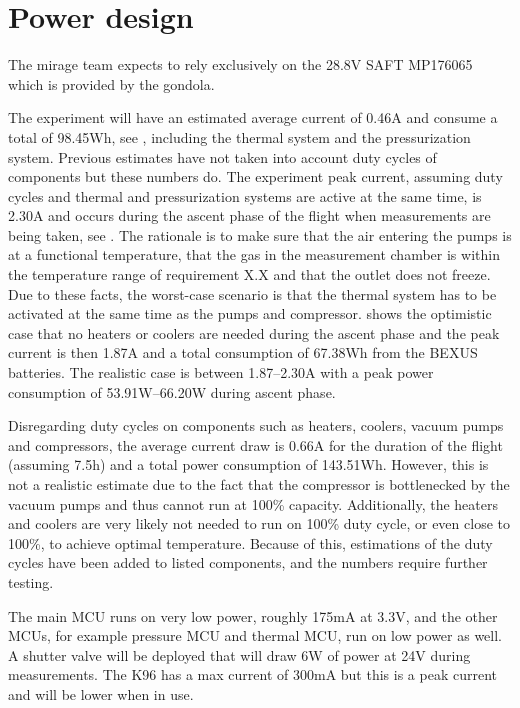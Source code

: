 \section{Power design}
\label{sec:power_design}

The \gls{mirage} team expects to rely exclusively on the 28.8V SAFT MP176065 which is provided by the gondola.

The experiment will have an estimated average current of 0.46A and consume a total of 98.45Wh, see , including the thermal system and the pressurization system. Previous estimates have not taken into account duty cycles of components but these numbers do. The experiment peak current, assuming duty cycles and thermal and pressurization systems are active at the same time, is 2.30A and occurs during the ascent phase of the flight when measurements are being taken, see . The rationale is to make sure that the air entering the pumps is at a functional temperature, that the gas in the measurement chamber is within the temperature range of requirement X.X and that the outlet does not freeze. Due to these facts, the worst-case scenario is that the thermal system has to be activated at the same time as the pumps and compressor.  shows the optimistic case that no heaters or coolers are needed during the ascent phase and the peak current is then 1.87A and a total consumption of 67.38Wh from the BEXUS batteries. The realistic case is between 1.87--2.30A with a peak power consumption of 53.91W--66.20W during ascent phase.

Disregarding duty cycles on components such as heaters, coolers, vacuum pumps and compressors, the average current draw is 0.66A for the duration of the flight (assuming 7.5h) and a total power consumption of 143.51Wh. However, this is not a realistic estimate due to the fact that the compressor is bottlenecked by the vacuum pumps and thus cannot run at 100\% capacity. Additionally, the heaters and coolers are very likely not needed to run on 100\% duty cycle, or even close to 100\%, to achieve optimal temperature. Because of this, estimations of the duty cycles have been added to listed components, and the numbers require further testing.

The main MCU runs on very low power, roughly 175mA at 3.3V, and the other MCUs, for example pressure MCU and thermal MCU, run on low power as well. A shutter valve will be deployed that will draw 6W of power at 24V during measurements. The K96 has a max current of 300mA but this is a peak current and will be lower when in use.

